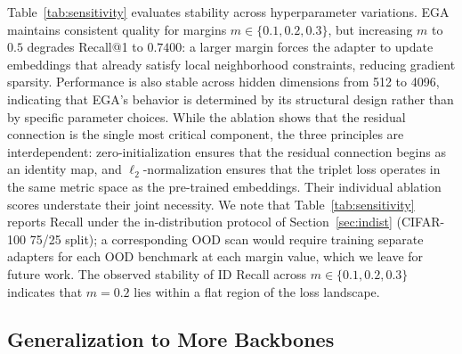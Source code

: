 \documentclass{article}
\begin{document}
Table~\ref{tab:sensitivity} evaluates stability across hyperparameter variations.
EGA maintains consistent quality for margins $m \in \{0.1, 0.2, 0.3\}$, but increasing $m$ to $0.5$ degrades Recall@1 to $0.7400$: a larger margin forces the adapter to update embeddings that already satisfy local neighborhood constraints, reducing gradient sparsity.
Performance is also stable across hidden dimensions from 512 to 4096, indicating that EGA's behavior is determined by its structural design rather than by specific parameter choices. While the ablation shows that the residual connection is the single most critical component, the three principles are interdependent: zero-initialization ensures that the residual connection begins as an identity map, and $\ell_2$-normalization ensures that the triplet loss operates in the same metric space as the pre-trained embeddings. Their individual ablation scores understate their joint necessity.
We note that Table~\ref{tab:sensitivity} reports Recall under the in-distribution protocol of Section~\ref{sec:indist} (CIFAR-100 75/25 split); a corresponding OOD scan would require training separate adapters for each OOD benchmark at each margin value, which we leave for future work. The observed stability of ID Recall across $m \in \{0.1, 0.2, 0.3\}$ indicates that $m=0.2$ lies within a flat region of the loss landscape.

\subsection{Generalization to More Backbones}
\end{document}
